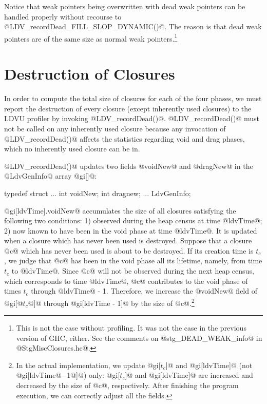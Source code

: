 \documentclass{article}
\begin{document}
Notice that weak pointers being overwritten with dead weak pointers can be handled 
properly without recourse to @LDV_recordDead_FILL_SLOP_DYNAMIC()@. The reason is 
that dead weak pointers are of the same size as normal weak 
pointers.\footnote{This is not the case without profiling. It was not the case 
in the previous version of
GHC, either. See the comments on @stg\_DEAD\_WEAK\_info@ in @StgMiscClosures.hc@.}

\section{Destruction of Closures}

In order to compute the total size of closures for each of the four phases,
we must report the destruction of every closure (except inherently used closures)
to the LDVU profiler by invoking @LDV_recordDead()@.
@LDV_recordDead()@ must not be called on any inherently used closure
because any invocation of @LDV_recordDead()@ affects the
statistics regarding void and drag phases, which no inherently used
closure can be in.

@LDV_recordDead()@ updates two fields @voidNew@ and @dragNew@ in the @LdvGenInfo@ 
array @gi[]@:

\begin{code}
typedef struct {
  ...
  int voidNew; 
  int dragnew;
  ...
} LdvGenInfo;
\end{code} 

@gi[ldvTime].voidNew@ accumulates the size of all closures satisfying the following
two conditions: 1) observed during the heap census at time @ldvTime@;
2) now known to have been in the void phase at time @ldvTime@.
It is updated when a closure which has never been used is destroyed.
Suppose that a closure @c@ which has never been used is about to be destroyed.
If its creation time is $t_c$, we judge that @c@ has been in the
void phase all its lifetime, namely, from time $t_c$ to @ldvTime@.
Since @c@ will not be observed during the next heap census, which corresponds
to time @ldvTime@, @c@ contributes to the void phase of times $t_c$ through
@ldvTime@ - 1.
Therefore, we increase the @voidNew@ field of @gi[@$t_c$@]@ through @gi[ldvTime - 1]@
by the size of @c@.\footnote{In the actual implementation, we update @gi[$t_c$]@ 
and @gi[ldvTime]@ (not @gi[ldvTime@$ - $1@]@) only: @gi[$t_c$]@ and @gi[ldvTime]@ 
are increased and decreased by the size of @c@, respectively. 
After finishing the program execution, we can correctly adjust all the fields.}
\end{document}
